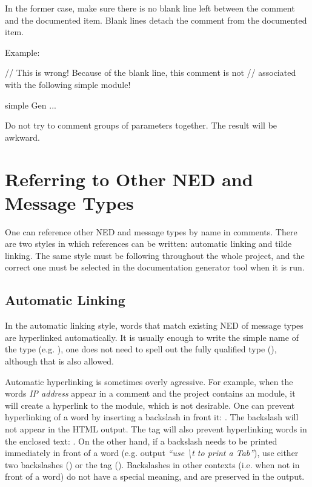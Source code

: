 In the former case, make sure there is no blank line left
between the comment and the documented item. Blank lines
detach the comment from the documented item.

Example:
\begin{ned}
// This is wrong! Because of the blank line, this comment is not
// associated with the following simple module!

simple Gen
{
    ...
}
\end{ned}

Do not try to comment groups of parameters together. The result
will be awkward.

\section{Referring to Other NED and Message Types}
\label{sec:neddoc:referring-to-other-ned-and-message-types}

One can reference other NED and message types by name in comments. There
are two styles in which references can be written: automatic linking and
tilde linking. The same style must be following throughout the whole
project, and the correct one must be selected in the documentation
generator tool when it is run.

\subsection{Automatic Linking}
\label{sec:neddoc:automatic-linking}

In the automatic linking style, words that match existing NED of message
types are hyperlinked automatically. It is usually enough to write the
simple name of the type (e.g. ), one does not need to spell out the
fully qualified type (), although that is also
allowed.

Automatic hyperlinking is sometimes overly agressive. For example, when the
words \textit{IP address} appear in a comment and the project contains an
 module, it will create a hyperlink to the module, which is not
desirable. One can prevent hyperlinking of a word by inserting a
backslash in front it: . The backslash will
not appear in the HTML output. The  tag will also prevent
hyperlinking words in the enclosed text: .
On the other hand, if a backslash needs to be printed immediately
in front of a word (e.g. output \textit{``use {\textbackslash}t to print a Tab''}),
use either two backslashes () or the
 tag ().
Backslashes in other contexts (i.e. when not in front of a word) do not have
a special meaning, and are preserved in the output.

